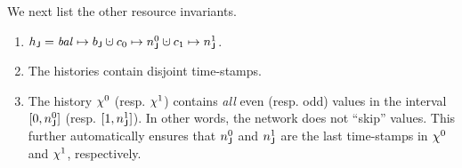 We next list the other resource invariants.
\vspace{2pt}
\begin{enumerate}[label=(\roman*)]

%


\item\label{cn:state} $\heapj = \bal \mapsto b_\joint \hunion c_0 \mapsto n^0_\joint
  \hunion c_1 \mapsto n^1_\joint$.

\item\label{cn:hvalid} The histories contain disjoint time-stamps. %
 

\item\label{cn:ci} 
%
  The history $\chi^0$ (resp. $\chi^1$) contains \emph{all} even
  (resp. odd) values in the interval $[0, n^0_{\mathsf{J}}]$ (resp. $[1,
    n^1_{\mathsf{J}}]$). In other words, the network does not ``skip''
  values. This further automatically ensures that $n^0_{\mathsf{J}}$ and
  $n^1_{\mathsf{J}}$ are the last time-stamps in $\chi^0$ and $\chi^1$,
  respectively.


\end{enumerate}
